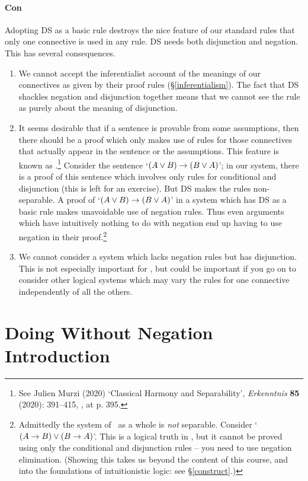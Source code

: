 \paragraph{Con} Adopting DS as a basic rule destroys the nice feature of our standard rules that only one connective is used in any rule. DS needs both disjunction and negation. This has several consequences.
\begin{enumerate}
	\item  We cannot accept the inferentialist account of the meanings of our connectives as given by their proof rules (§\ref{inferentialism}). The fact that DS shackles negation and disjunction together means that we cannot see the rule as purely about the meaning of disjunction.
	\item It seems desirable that if a sentence is provable from some assumptions, then there should be a proof which only makes use of rules for those connectives that actually appear in the sentence or the assumptions. This feature is known as .\footnote{See Julien Murzi (2020) ‘Classical Harmony and Separability’, \emph{Erkenntnis} \textbf{85} (2020): 391–415, , at p. 395.}  Consider the sentence `$(A \vee B) \rightarrow (B\vee A)$'; in our system, there is a proof of this sentence which involves only rules for conditional and disjunction (this is left for an exercise). But DS makes the rules non-separable. A proof of `$(A \vee B) \rightarrow (B\vee A)$' in a system which has DS as a basic rule makes unavoidable use of negation rules. Thus even arguments which have intuitively nothing to do with negation end up having to use negation in their proof.\footnote{Admittedly the system of \TFL\ as a whole is \emph{not} separable. Consider `$(A \rightarrow B) \vee (B \rightarrow A)$'. This is a logical truth in \TFL, but it cannot be proved using only the conditional and disjunction rules – you need to use negation elimination. (Showing this takes us beyond the content of this course, and into the foundations of intuitionistic logic: see §\ref{construct}.)} 
 	\item We cannot consider a system which lacks negation rules but has disjunction. This is not especially important for \TFL, but could be important if you go on to consider other logical systems which may vary the rules for one connective independently of all the others.
 \end{enumerate}


\section{Doing Without Negation Introduction} 

